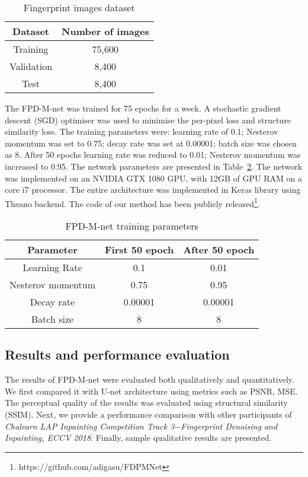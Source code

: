 \documentclass{llncs}
\begin{document}
\begin{table}[h!]
\centering
\addtolength{\tabcolsep}{20pt}
\begin{tabular}{ c | c}
    \hline \hline
    Dataset      & Number of images \\ [0.5ex] \hline \hline
    Training     & 75,600           \\ 
    Validation   & 8,400            \\ 
    Test         & 8,400            \\ [0.3ex] \hline \hline
\end{tabular}
\caption{Fingerprint images dataset}
\label{table:dataset}
\end{table}

The FPD-M-net was trained for 75 epochs for a week. A stochastic gradient descent (SGD) optimiser was used to minimise the per-pixel loss and structure similarity loss. The training parameters were: learning rate of 0.1; Nesterov momentum was set to 0.75; decay rate was set at 0.00001; batch size was chosen as 8. After 50 epochs learning rate was reduced to 0.01; Nesterov momentum was increased to 0.95. The network parameters are presented in Table~\ref{table:parameter}. The network was implemented on an NVIDIA GTX 1080 GPU, with 12GB of GPU RAM on a core i7 processor. The entire architecture was implemented in Keras library using Theano backend. The code of our method has been publicly released\footnote{https://github.com/adigasu/FDPMNet}.

\begin{table}[h!]
\centering
\addtolength{\tabcolsep}{10pt}
\begin{tabular}{ c | c | c}
    \hline \hline
    Parameter         & First 50 epoch & After 50 epoch \\ [0.5ex] \hline \hline
    Learning Rate     & 0.1            & 0.01           \\ 
    Nesterov momentum & 0.75           & 0.95           \\ 
    Decay rate        & 0.00001        & 0.00001        \\ 
    Batch size        & 8              & 8              \\ [0.3ex] \hline \hline
\end{tabular}
\caption{FPD-M-net training parameters}
\label{table:parameter}
\end{table}
\vspace{-1.3cm}

\subsection{Results and performance evaluation}
\label{ssec:results}
\vspace{-0.1cm}
The results of FPD-M-net were evaluated both qualitatively and quantitatively. We first compared it with U-net architecture using metrics such as PSNR, MSE. The perceptual quality of the results was evaluated using structural similarity (SSIM). Next, we provide a performance comparison with other participants of \textit{Chalearn LAP Inpainting Competition Track 3$ - $Fingerprint Denoising and Inpainting, ECCV 2018}. Finally, sample qualitative results are presented.
\end{document}
